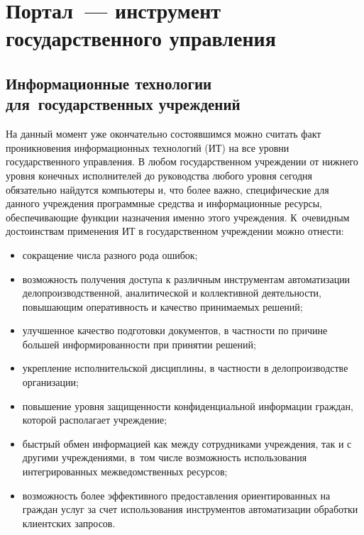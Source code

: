       \begin{multicols}{2}


      \label{st\stat}


\section{Портал~--- инструмент государственного управления}

\subsection{Информационные технологии для~государственных учреждений} %

На данный момент уже окончательно состоявшимся можно считать факт проникновения
информационных технологий (ИТ)
на все уровни государственного управления. В любом
государственном учреждении от нижнего уровня конечных исполнителей до руководства
любого уровня сегодня обязательно найдутся компьютеры и, что более важно,
специфические для данного учреждения про\-грам\-мные средства и информационные
ресурсы, обеспечивающие функции назначения именно этого уч\-реж\-дения. К~очевидным
достоинствам применения ИТ в государственном учреждении
можно отнести:
\begin{itemize}
\item сокращение числа разного рода ошибок;
\item возможность получения доступа к различным инструментам автоматизации
делопроизводственной, аналитической и коллективной деятельности, повышающим
оперативность и качество принимаемых решений;
\item улучшенное качество подготовки документов, в частности по причине большей
информированности при принятии решений;
\item укрепление исполнительской дисциплины, в частности в делопроизводстве
организации;
\item повышение уровня защищенности конфиденциальной информации граждан,
которой располагает учреждение;
\item быстрый обмен информацией как между сотрудниками уч\-реж\-де\-ния, так и с
другими уч\-реж\-де\-ни\-ями, в~том числе возможность использования интегрированных
межведомственных ресурсов;
\item возможность более эффективного предо\-став\-ле\-ния ориентированных на граждан
услуг за счет использования инструментов автоматизации обработки клиентских
запросов.
\end{itemize}


\end{multicols}
